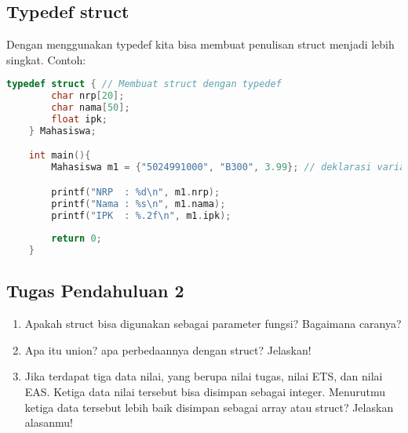 \subsection{Typedef struct}

Dengan menggunakan typedef kita bisa membuat penulisan struct menjadi lebih singkat.
Contoh:
\begin{lstlisting}[language=c]
	typedef struct { // Membuat struct dengan typedef
		char nrp[20];
		char nama[50];
		float ipk;
	} Mahasiswa;

	int main(){
		Mahasiswa m1 = {"5024991000", "B300", 3.99}; // deklarasi variabel struct tanpa menulis struct Mahasiswa.

		printf("NRP  : %d\n", m1.nrp);
		printf("Nama : %s\n", m1.nama);
		printf("IPK  : %.2f\n", m1.ipk);
		
		return 0;
	}
\end{lstlisting}

\subsection*{Tugas Pendahuluan 2}
\begin{enumerate}
    \item Apakah struct bisa digunakan sebagai parameter fungsi? Bagaimana caranya?
    \item Apa itu union? apa perbedaannya dengan struct? Jelaskan!
    \item Jika terdapat tiga data nilai, yang berupa nilai tugas, nilai ETS, dan nilai EAS.
    Ketiga data nilai tersebut bisa disimpan sebagai integer.
    Menurutmu ketiga data tersebut lebih baik disimpan sebagai array atau struct? Jelaskan alasanmu!
\end{enumerate}